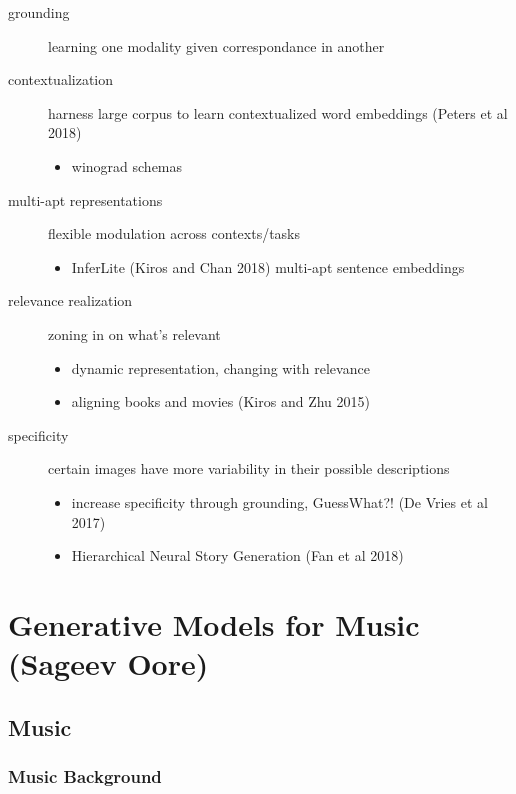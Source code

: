 \documentclass[]{article}
\theoremstyle{definition}
\begin{document}
    \begin{description}
        \item[grounding] learning one modality given correspondance in another
        \item[contextualization] harness large corpus to learn contextualized word embeddings (Peters et al 2018)
            \begin{itemize}
                \item winograd schemas
            \end{itemize}
        \item[multi-apt representations] flexible modulation across contexts/tasks
            \begin{itemize}
                \item InferLite (Kiros and Chan 2018) multi-apt sentence embeddings
            \end{itemize}
        \item[relevance realization] zoning in on what's relevant
            \begin{itemize}
                \item dynamic representation, changing with relevance
                \item aligning books and movies (Kiros and Zhu 2015)
            \end{itemize}
        \item[specificity] certain images have more variability in their possible descriptions
            \begin{itemize}
                \item increase specificity through grounding, GuessWhat?! (De Vries et al 2017)
                \item Hierarchical Neural Story Generation (Fan et al 2018)
            \end{itemize}
    \end{description}

    \section{Generative Models for Music {\small(Sageev Oore)}}%
    \label{sec:generative_models_for_music_small_sageev_oore_}

    \subsection{Music}%
    \label{sub:music}

    \subsubsection{Music Background}%
    \label{ssub:music_background}
\end{document}
